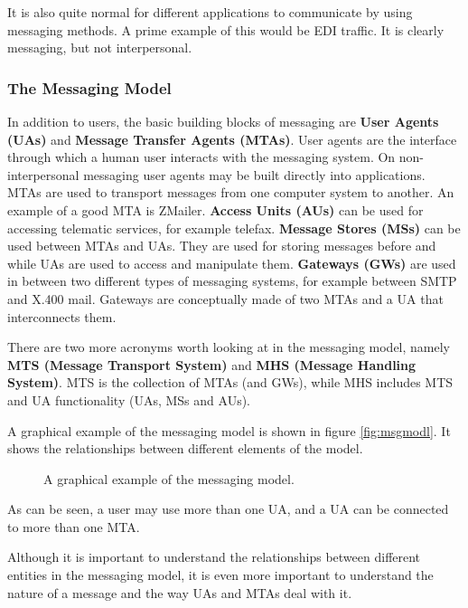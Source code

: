 It is also quite normal for different applications to communicate by using
messaging methods.
A prime example of this would be EDI traffic. It is clearly messaging,
but not interpersonal.



\subsubsection{The Messaging Model}

In addition to users, the basic building blocks of messaging are
{\bf User Agents (UAs)} and {\bf Message Transfer Agents (MTAs)}.
User agents are the interface through which a human user interacts with
the messaging system.
On non-interpersonal messaging user agents may be built directly into
applications.
MTAs are used to transport messages from one computer system to another.
An example of a good MTA is ZMailer. 
{\bf Access Units (AUs)} can be used for accessing telematic services,
for example telefax. 
{\bf Message Stores (MSs)} can be used between MTAs and UAs.
They are used for storing messages before and while UAs are used
to access and manipulate them.
{\bf Gateways (GWs)} are used in between two different types
of messaging systems, for example between SMTP and X.400 mail.
Gateways are conceptually made of two MTAs and a UA that interconnects them.

There are two more acronyms worth looking at in the messaging model,
namely {\bf MTS (Message Transport System)} and
{\bf MHS (Message Handling System)}.
MTS is the collection of MTAs (and GWs),
while MHS includes MTS and UA functionality (UAs, MSs and AUs).


A graphical example of the messaging model is shown in figure
\vref{fig:msgmodl}.    It shows the relationships between different
elements of the model.

\begin{figure}[ht]
  \caption{\label{fig:msgmodl}A graphical example of the messaging model.}
\end{figure}

As can be seen, a user may use more than one UA, and a UA can be connected 
to more than one MTA.

Although it is important to understand the relationships between different 
entities in the messaging model, it is even more important to understand the 
nature of a message and the way UAs and MTAs deal with it.

